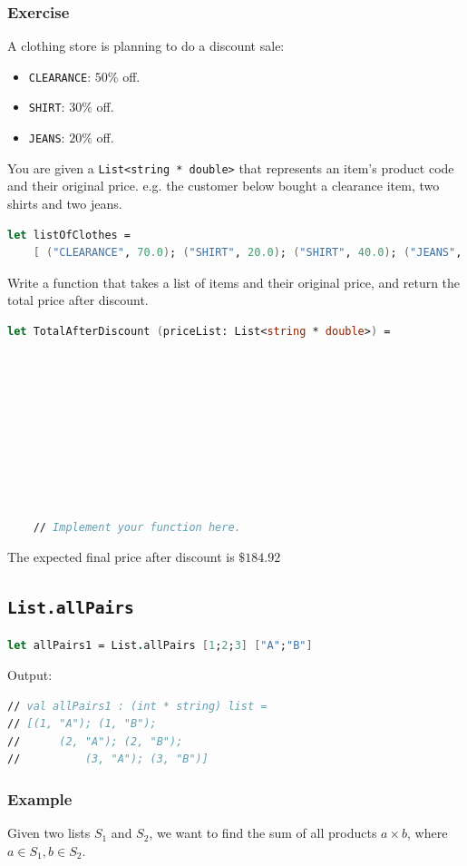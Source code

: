 \documentclass[12pt]{article}
\begin{document}
\subsubsection*{Exercise}
A clothing store is planning to do a discount sale:
\begin{itemize}
\item \texttt{CLEARANCE}: $50\%$ off.
\item \texttt{SHIRT}: $30\%$ off.
\item \texttt{JEANS}: $20\%$ off.
\end{itemize}
You are given a \texttt{List<string * double>} that represents an item's product code and their original price. e.g. the customer below bought a clearance item, two shirts and two jeans.

\begin{lstlisting}[language=FSharp]
let listOfClothes =
    [ ("CLEARANCE", 70.0); ("SHIRT", 20.0); ("SHIRT", 40.0); ("JEANS", 55.0); ("JEANS", 79.9)]
\end{lstlisting}
Write a function that takes a list of items and their original price, and return the total price after discount.


\begin{lstlisting}[language=FSharp]
let TotalAfterDiscount (priceList: List<string * double>) =
    









    // Implement your function here.
\end{lstlisting}
The expected final price after discount is $\$184.92$

\subsection{\texttt{List.allPairs}}

\begin{lstlisting}[language=FSharp]
let allPairs1 = List.allPairs [1;2;3] ["A";"B"]
\end{lstlisting}
Output:
\begin{lstlisting}[language=FSharp]
// val allPairs1 : (int * string) list = 
// [(1, "A"); (1, "B"); 
//      (2, "A"); (2, "B"); 
//          (3, "A"); (3, "B")]
\end{lstlisting}

\pagebreak

\subsubsection*{Example}
Given two lists $S_1$ and $S_2$, we want to find the sum of all products $a \times b$, where $a \in S_1, b \in S_2$.
\end{document}
